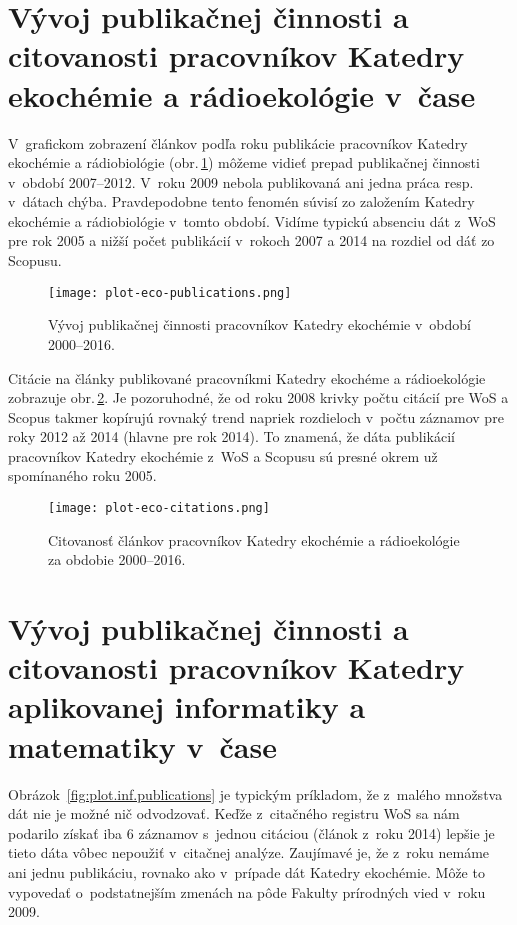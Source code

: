 \section{Vývoj publikačnej činnosti a citovanosti pracovníkov Katedry ekochémie
  a rádioekológie v~čase}

V~grafickom zobrazení článkov podľa roku publikácie pracovníkov Katedry
ekochémie a rádiobiológie (obr.\,\ref{fig:plot.eco.publications}) môžeme vidieť
prepad publikačnej činnosti v~období 2007--2012.  V~roku 2009 nebola publikovaná
ani jedna práca resp. v~dátach chýba.  Pravdepodobne tento fenomén súvisí zo
založením Katedry ekochémie a rádiobiológie v~tomto období.  Vidíme typickú
absenciu dát z~WoS pre rok 2005 a nižší počet publikácií v~rokoch 2007 a 2014 na
rozdiel od dáť zo Scopusu.

\begin{figure}
  \centering
  \texttt{[image: plot-eco-publications.png]}
  \caption{Vývoj publikačnej činnosti pracovníkov Katedry ekochémie v~období
    2000--2016.}
  \label{fig:plot.eco.publications}
\end{figure}

Citácie na články publikované pracovníkmi Katedry ekochéme a rádioekológie
zobrazuje obr.\,\ref{fig:plot.eco.citations}.  Je pozoruhodné, že od roku 2008
krivky počtu citácií pre WoS a Scopus takmer kopírujú rovnaký trend napriek
rozdieloch v~počtu záznamov pre roky 2012 až 2014 (hlavne pre rok 2014).  To
znamená, že dáta publikácií pracovníkov Katedry ekochémie z~WoS a Scopusu sú
presné okrem už spomínaného roku 2005.

\begin{figure}
  \centering
  \texttt{[image: plot-eco-citations.png]}
  \caption{Citovanosť článkov pracovníkov Katedry ekochémie a rádioekológie za
    obdobie 2000--2016.}
  \label{fig:plot.eco.citations}
\end{figure}


\section{Vývoj publikačnej činnosti a citovanosti pracovníkov Katedry
  aplikovanej informatiky a matematiky v~čase}

Obrázok~\ref{fig:plot.inf.publications} je typickým príkladom, že z~malého
množstva dát nie je možné nič odvodzovať.  Keďže z~citačného registru WoS sa nám
podarilo získať iba 6 záznamov s~jednou citáciou (článok z~roku 2014) lepšie je
tieto dáta vôbec nepoužiť v~citačnej analýze.  Zaujímavé je, že z~roku nemáme
ani jednu publikáciu, rovnako ako v~prípade dát Katedry ekochémie.  Môže to
vypovedať o~podstatnejším zmenách na pôde Fakulty prírodných vied v~roku 2009.


